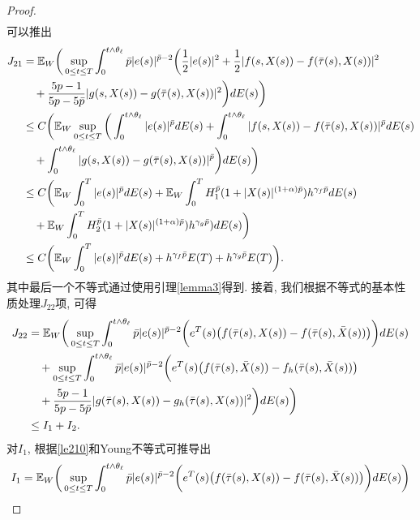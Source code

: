 \begin{proof}
\begin{align*}
\end{align*}
可以推出
\begin{align}
    \label{lemm331}
    J_{21}& =
    \mathbb{E}_W\bigg(\sup_{0\leq t\leq T}\int^{t\wedge\theta_{\ell}}_{0}\bar{p}|e(s)|^{\bar{p}-2}\bigg(\frac{1}{2}|e(s)|^2+\frac{1}{2}|f(s,X(s))-f(\bar{\tau}(s),X(s))|^2\nonumber\\
    &\quad+\dfrac{5p-1}{5p-5\bar{p}}|g(s,X(s))-g(\bar{\tau}(s),X(s))|^2\bigg)dE(s)\bigg)\nonumber\\
    &\leq
    C\bigg(\mathbb{E}_W\sup_{0\leq t\leq T}\bigg(\int^{t\wedge\theta_{\ell}}_{0}|e(s)|^{\bar{p}}dE(s)+ \int^{t\wedge\theta_{\ell}}_{0}|f(s,X(s))-f(\bar{\tau}(s),X(s))|^{\bar{p}}dE(s)\nonumber\\
    &\quad +\int^{t\wedge\theta_{\ell}}_{0}|g(s,X(s))-g(\bar{\tau}(s),X(s))|^{\bar{p}}\bigg)dE(s)\bigg)\nonumber\\
    &\leq
    C\bigg(\mathbb{E}_W\int^{T}_{0}|e(s)|^{\bar{p}}dE(s)
    +\mathbb{E}_W\int^{T}_{0}H_1^{\bar{p}}(1+|X(s)|^{(1+\alpha)\bar{p}})h ^{\gamma_f\bar{p}}dE(s)\nonumber\\
    &\quad  +\mathbb{E}_W\int^{T}_{0}H_2^{\bar{p}}(1+|X(s)|^{(1+\alpha)\bar{p}})h^{\gamma_g\bar{p}})dE(s)\bigg)\nonumber\\
    &\leq
    C\bigg(\mathbb{E}_W\int^{T}_{0}|e(s)|^{\bar{p}}dE(s)
    +h^{\gamma_f\bar{p}}E(T)+h^{\gamma_g\bar{p}}E(T)\bigg).
\end{align}
其中最后一个不等式通过使用引理\ref{lemma3}得到. 接着, 我们根据不等式的基本性质处理$J_{22}$项, 可得
\begin{align}
    \label{lem332}
    J_{22}&= \mathbb{E}_W\bigg(\sup_{0\leq t\leq T}\int^{t\wedge\theta_{\ell}}_{0}\bar{p}|e(s)|^{\bar{p}-2}\bigg(e^{T}(s)\big(f(\bar{\tau}(s),X(s))-f(\bar{\tau}(s),\bar{X}(s))\big)\bigg)dE(s)\nonumber\\
    &\quad+
    \sup_{0\leq t\leq T}\int^{t\wedge\theta_{\ell}}_{0}\bar{p}|e(s)|^{\bar{p}-2}\bigg(e^{T}(s)\big(f(\bar{\tau}(s),\bar{X}(s))-f_{h}(\bar{\tau}(s),\bar{X}(s))\big)\nonumber\\
    &\quad+\dfrac{5p-1}{5p-5\bar{p}}|g(\bar{\tau}(s),X(s))-g_h(\bar{\tau}(s),X(s))|^2\bigg)dE(s)\bigg)\nonumber\\
    &\leq I_1+ I_2.
\end{align}
对$I_1$, 根据\eqref{le210}和Young不等式可推导出
\begin{align}
    \label{333}
    I_{1}&=\EE_W\bigg(\sup_{0\leq t\leq T}\int^{t\wedge\theta_{\ell}}_{0}\bar{p}|e(s)|^{\bar{p}-2}\bigg(e^{T}(s)\big(f(\bar{\tau}(s),X(s))-f(\bar{\tau}(s),\bar{X}(s))\big)\bigg)dE(s)\bigg)\nonumber\\

\end{align}
\end{proof}
